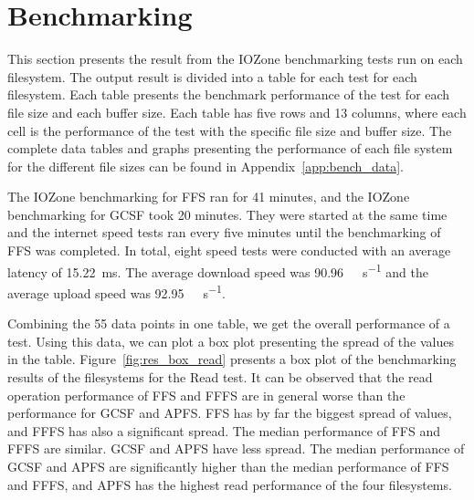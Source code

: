 \section{Benchmarking}
\label{sec:res_bench}
This section presents the result from the IOZone benchmarking tests run on each filesystem. The output result is divided into a table for each test for each filesystem. Each table presents the benchmark performance of the test for each file size and each buffer size. Each table has five rows and 13 columns, where each cell is the performance of the test with the specific file size and buffer size. The complete data tables and graphs presenting the performance of each file system for the different file sizes can be found in Appendix~\ref{app:bench_data}.

The IOZone benchmarking for \gls{FFS} ran for 41 minutes, and the IOZone benchmarking for \gls{GCSF} took 20 minutes. They were started at the same time and the internet speed tests ran every five minutes until the benchmarking of \gls{FFS} was completed. In total, eight speed tests were conducted with an average latency of \SI{15.22}{\milli\second}. The average download speed was \SI[per-mode = symbol]{90.96}{\mega\bit\per\second} and the average upload speed was \SI[per-mode = symbol]{92.95}{\mega\bit\per\second}.

Combining the 55 data points in one table, we get the overall performance of a test. Using this data, we can plot a box plot presenting the spread of the values in the table. Figure~\ref{fig:res_box_read} presents a box plot of the benchmarking results of the filesystems for the Read test. It can be observed that the read operation performance of \gls{FFS} and \gls{FFFS} are in general worse than the performance for \gls{GCSF} and \gls{APFS}. \gls{FFS} has by far the biggest spread of values, and \gls{FFFS} has also a significant spread. The median performance of \gls{FFS} and \gls{FFFS} are similar. \gls{GCSF} and \gls{APFS} have less spread. The median performance of \gls{GCSF} and \gls{APFS} are significantly higher than the median performance of \gls{FFS} and \gls{FFFS}, and \gls{APFS} has the highest read performance of the four filesystems.

